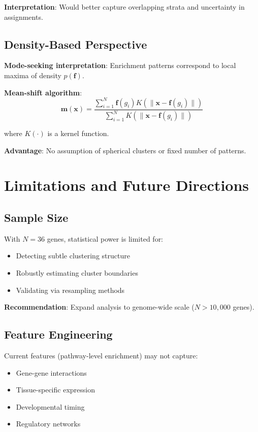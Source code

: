 \documentclass[12pt,letterpaper]{article}
\theoremstyle{definition}
\theoremstyle{remark}
\begin{document}
\textbf{Interpretation}: Would better capture overlapping strata and uncertainty in assignments.

\subsection{Density-Based Perspective}

\textbf{Mode-seeking interpretation}: Enrichment patterns correspond to local maxima of density $p(\mathbf{f})$.

\textbf{Mean-shift algorithm}:
\begin{equation}
\mathbf{m}(\mathbf{x}) = \frac{\sum_{i=1}^N \mathbf{f}(g_i) K(\|\mathbf{x} - \mathbf{f}(g_i)\|)}{\sum_{i=1}^N K(\|\mathbf{x} - \mathbf{f}(g_i)\|)}
\end{equation}

where $K(\cdot)$ is a kernel function.

\textbf{Advantage}: No assumption of spherical clusters or fixed number of patterns.

\section{Limitations and Future Directions}

\subsection{Sample Size}

With $N=36$ genes, statistical power is limited for:
\begin{itemize}
    \item Detecting subtle clustering structure
    \item Robustly estimating cluster boundaries
    \item Validating via resampling methods
\end{itemize}

\textbf{Recommendation}: Expand analysis to genome-wide scale ($N > 10,000$ genes).

\subsection{Feature Engineering}

Current features (pathway-level enrichment) may not capture:
\begin{itemize}
    \item Gene-gene interactions
    \item Tissue-specific expression
    \item Developmental timing
    \item Regulatory networks
\end{itemize}
\end{document}

